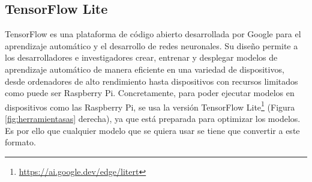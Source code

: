 \subsection{TensorFlow Lite}
\label{subsec:tflite}

TensorFlow es una plataforma de código abierto desarrollada por Google para el aprendizaje automático y el desarrollo de redes neuronales. Su diseño permite a los desarrolladores e investigadores crear, entrenar y desplegar modelos de aprendizaje automático de manera eficiente en una variedad de dispositivos, desde ordenadores de alto rendimiento hasta dispositivos con recursos limitados como puede ser Raspberry Pi. Concretamente, para poder ejecutar modelos en dispositivos como las Raspberry Pi, se usa la versión TensorFlow Lite\footnote{\url{https://ai.google.dev/edge/litert}} (Figura \ref{fig:herramientasas} derecha), ya que está preparada para optimizar los modelos. Es por ello que cualquier modelo que se quiera usar se tiene que convertir a este formato. 



